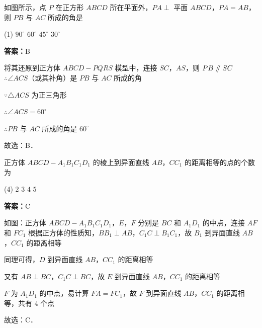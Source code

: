\vspace{2em}

\begin{example}[\bkstar{3}{5}]
如图所示，点 $P$ 在正方形 $ABCD$ 所在平面外，$PA\perp$ 平面 $ABCD$，$PA=AB$，则 $PB$ 与 $AC$ 所成的角是
\begin{tasks}(1)
    \task $90^{\circ}$
    \task $60^{\circ}$
    \task $45^{\circ}$
    \task $30^{\circ}$
\end{tasks}
\end{example}
\begin{solution}
\textbf{答案：}B

将其还原到正方体 $ABCD-PQRS$ 模型中，连接 $SC$，$AS$，则 $PB\mathrel{/\mkern-5mu/} SC$
$\therefore \angle ACS$（或其补角）是 $PB$ 与 $AC$ 所成的角

$\because \triangle ACS$ 为正三角形

$\therefore \angle ACS=60^{\circ}$

$\therefore PB$ 与 $AC$ 所成的角是 $60^{\circ}$

故选：B．
\end{solution}

\vspace{2em}


\begin{example}[\bkstar{3}{5}]
正方体 $ABCD-A_1B_1C_1D_1$ 的棱上到异面直线 $AB$，$CC_1$ 的距离相等的点的个数为
\begin{tasks}(4)
    \task $2$
    \task $3$
    \task $4$
    \task $5$
\end{tasks}
\end{example}
\begin{solution}
\textbf{答案：}C

如图：正方体 $ABCD-A_1B_1C_1D_1$，$E$，$F$ 分别是 $BC$ 和 $A_1D_1$ 的中点，连接 $AF$ 和 $FC_1$
根据正方体的性质知，$BB_1\perp AB$，$C_1C\perp B_1C_1$，故 $B_1$ 到异面直线 $AB$，$CC_1$ 的距离相等

同理可得，$D$ 到异面直线 $AB$，$CC_1$ 的距离相等

又有 $AB\perp BC$，$C_1C\perp BC$，故 $E$ 到异面直线 $AB$，$CC_1$ 的距离相等

$F$ 为 $A_1D_1$ 的中点，易计算 $FA=FC_1$，故 $F$ 到异面直线 $AB$，$CC_1$ 的距离相等，共有 $4$ 个点

故选：C．
\end{solution}

